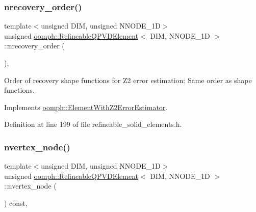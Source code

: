\subsubsection{\texorpdfstring{nrecovery\+\_\+order()}{nrecovery\_order()}}
{\footnotesize\ttfamily template$<$unsigned D\+IM, unsigned N\+N\+O\+D\+E\+\_\+1D$>$ \\
unsigned \hyperlink{classoomph_1_1RefineableQPVDElement}{oomph\+::\+Refineable\+Q\+P\+V\+D\+Element}$<$ D\+IM, N\+N\+O\+D\+E\+\_\+1D $>$\+::nrecovery\+\_\+order (\begin{DoxyParamCaption}{ }\end{DoxyParamCaption})\hspace{0.3cm}{\ttfamily [inline]}, {\ttfamily [virtual]}}



Order of recovery shape functions for Z2 error estimation\+: Same order as shape functions. 



Implements \hyperlink{classoomph_1_1ElementWithZ2ErrorEstimator_af39480835bd3e0f6b2f4f7a9a4044798}{oomph\+::\+Element\+With\+Z2\+Error\+Estimator}.



Definition at line 199 of file refineable\+\_\+solid\+\_\+elements.\+h.

\mbox{\label{classoomph_1_1RefineableQPVDElement_aa4b6b0cf475e1e26fc26ac8a17ddfac9}} 
\subsubsection{\texorpdfstring{nvertex\+\_\+node()}{nvertex\_node()}}
{\footnotesize\ttfamily template$<$unsigned D\+IM, unsigned N\+N\+O\+D\+E\+\_\+1D$>$ \\
unsigned \hyperlink{classoomph_1_1RefineableQPVDElement}{oomph\+::\+Refineable\+Q\+P\+V\+D\+Element}$<$ D\+IM, N\+N\+O\+D\+E\+\_\+1D $>$\+::nvertex\+\_\+node (\begin{DoxyParamCaption}{ }\end{DoxyParamCaption}) const\hspace{0.3cm}{\ttfamily [inline]}, {\ttfamily [virtual]}}



